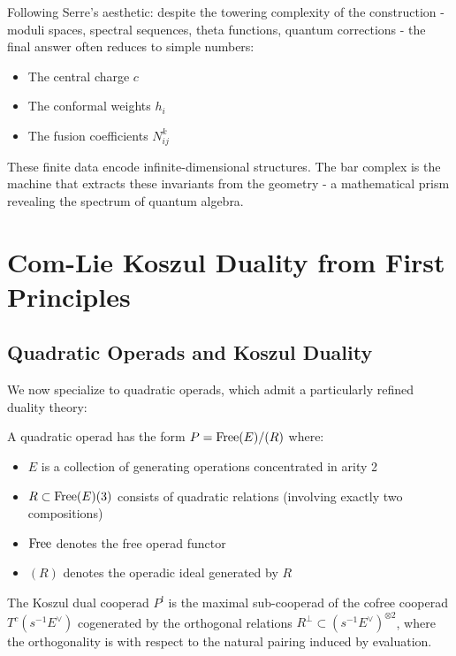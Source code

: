 \begin{remark}
Following Serre's aesthetic: despite the towering complexity of the construction - moduli spaces, spectral sequences, theta functions, quantum corrections - the final answer often reduces to simple numbers:
\begin{itemize}
\item The central charge $c$
\item The conformal weights $h_i$  
\item The fusion coefficients $N_{ij}^k$
\end{itemize}
These finite data encode infinite-dimensional structures. The bar complex is the machine that extracts these invariants from the geometry - a mathematical prism revealing the spectrum of quantum algebra.
\end{remark}

\section{Com-Lie Koszul Duality from First Principles}
 
\subsection{Quadratic Operads and Koszul Duality}
 
We now specialize to quadratic operads, which admit a particularly refined duality theory:
 
\begin{definition}
A quadratic operad has the form $P = \operatorname{Free}(E)/(R)$ where:
\begin{itemize}
\item $E$ is a collection of generating operations concentrated in arity 2
\item $R \subset \operatorname{Free}(E)(3)$ consists of quadratic relations (involving exactly two compositions)
\item $\operatorname{Free}$ denotes the free operad functor
\item $(R)$ denotes the operadic ideal generated by $R$
\end{itemize}
\end{definition}
 
\begin{definition}
The Koszul dual cooperad $P^!$ is the maximal sub-cooperad of the cofree cooperad $T^c(s^{-1}E^\vee)$ cogenerated by the orthogonal relations $R^\perp \subset (s^{-1}E^\vee)^{\otimes 2}$, where the orthogonality is with respect to the natural pairing induced by evaluation.
\end{definition}
 
